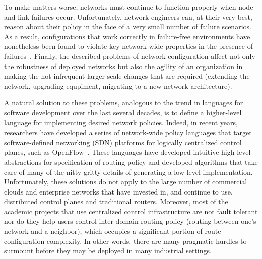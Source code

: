 To make matters worse, networks must continue to function properly when node and link failures occur.  
Unfortunately, network engineers
can, at their very best, reason about their policy in the face of a very small number of failure 
scenarios.  As a result, configurations that work
correctly in failure-free environments have nonetheless been found to violate key
network-wide properties in the presence of failures~\cite{batfish}.
Finally, the described problems of network configuration affect not only the robustness of deployed networks but also the agility of an organization in making the not-infrequent larger-scale changes that are required (extending the network, upgrading equpiment, migrating to a new network architecture).

A natural solution to these problems, analogous to the trend in languages for software development over the last several decades, is to define a higher-level language for implementing desired network policies.  
Indeed, in recent years, researchers have developed a series of network-wide policy 
languages that target  software-defined networking (SDN) platforms for logically centralized control planes, such as OpenFlow~\cite{frenetic,srikant,flowlog,foster:merlin,vericon,sagiv:l,fattire,netkat,kinetic,sdn-languages}. These languages have developed intuitive high-level abstractions for specification
of routing policy and developed algorithms that take care of many of the nitty-gritty details of
generating a low-level implementation.
Unfortunately, these solutions do not apply to the large number of commercial clouds and 
enterprise networks that have invested in, and continue to use, distributed control planes and 
traditional routers.  Moreover, most of the academic projects that use centralized control 
infrastructure are not fault tolerant nor do they help users control inter-domain routing
policy (routing between one's network and a neighbor), which occupies a significant portion of route
configuration complexity.  In other words, there are many pragmatic hurdles to surmount before
they may be deployed in many industrial settings.


